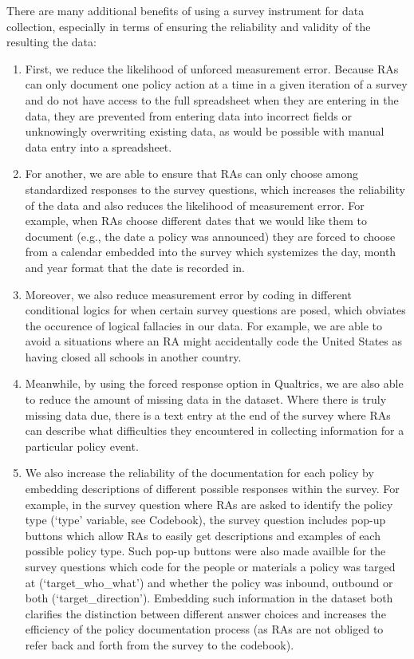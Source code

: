 \documentclass[]{article}
\begin{document}
There are many additional benefits of using a survey instrument for data collection, especially in terms of ensuring the reliability and validity of the resulting the data:

\begin{enumerate}
\def\labelenumi{\arabic{enumi}.}
\item
  First, we reduce the likelihood of unforced measurement error. Because RAs can only document one policy action at a time in a given iteration of a survey and do not have access to the full spreadsheet when they are entering in the data, they are prevented from entering data into incorrect fields or unknowingly overwriting existing data, as would be possible with manual data entry into a spreadsheet.
\item
  For another, we are able to ensure that RAs can only choose among standardized responses to the survey questions, which increases the reliability of the data and also reduces the likelihood of measurement error. For example, when RAs choose different dates that we would like them to document (e.g., the date a policy was announced) they are forced to choose from a calendar embedded into the survey which systemizes the day, month and year format that the date is recorded in.
\item
  Moreover, we also reduce measurement error by coding in different conditional logics for when certain survey questions are posed, which obviates the occurence of logical fallacies in our data. For example, we are able to avoid a situations where an RA might accidentally code the United States as having closed all schools in another country.
\item
  Meanwhile, by using the forced response option in Qualtrics, we are also able to reduce the amount of missing data in the dataset. Where there is truly missing data due, there is a text entry at the end of the survey where RAs can describe what difficulties they encountered in collecting information for a particular policy event.
\item
  We also increase the reliability of the documentation for each policy by embedding descriptions of different possible responses within the survey. For example, in the survey question where RAs are asked to identify the policy type (`type' variable, see Codebook), the survey question includes pop-up buttons which allow RAs to easily get descriptions and examples of each possible policy type. Such pop-up buttons were also made availble for the survey questions which code for the people or materials a policy was targed at (`target\_who\_what') and whether the policy was inbound, outbound or both (`target\_direction'). Embedding such information in the dataset both clarifies the distinction between different answer choices and increases the efficiency of the policy documentation process (as RAs are not obliged to refer back and forth from the survey to the codebook).

\end{enumerate}
\end{document}
